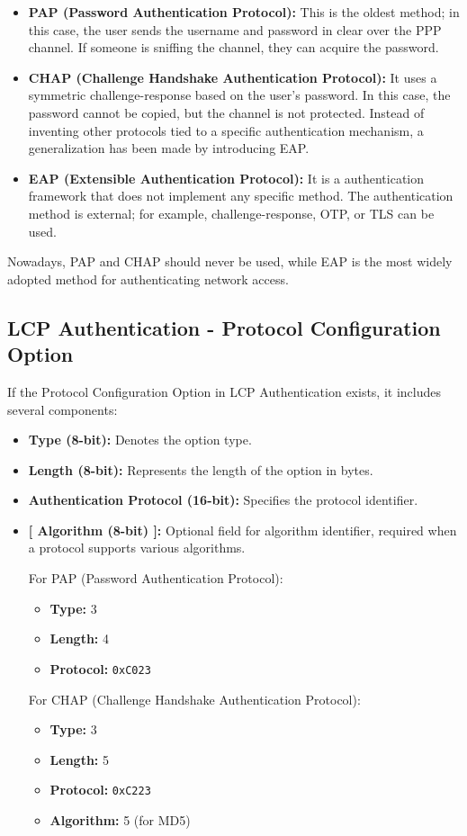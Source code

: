 \begin{itemize}
	\item \textbf{PAP (Password Authentication Protocol):} This is the oldest method; in this case, the user sends the username and password in clear over the PPP channel. If someone is sniffing the channel, they can acquire the password.

	\item \textbf{CHAP (Challenge Handshake Authentication Protocol):} It uses a symmetric challenge-response based on the user's password. In this case, the password cannot be copied, but the channel is not protected. Instead of inventing other protocols tied to a specific authentication mechanism, a generalization has been made by introducing EAP.

	\item \textbf{EAP (Extensible Authentication Protocol):} It is a authentication framework that does not implement any specific method. The authentication method is external; for example, challenge-response, OTP, or TLS can be used.
\end{itemize}

Nowadays, PAP and CHAP should never be used, while EAP is the most widely adopted method for authenticating network access.

\subsection{LCP Authentication - Protocol
	Configuration Option}
If the Protocol Configuration Option in LCP Authentication exists, it includes several components:

\begin{itemize}
	\item \textbf{Type (8-bit):} Denotes the option type.
	\item \textbf{Length (8-bit):} Represents the length of the option in bytes.
	\item \textbf{Authentication Protocol (16-bit):} Specifies the protocol identifier.
	\item \textbf{[ Algorithm (8-bit) ]:} Optional field for algorithm identifier, required when a protocol supports various algorithms.

	      For PAP (Password Authentication Protocol):
	      \begin{itemize}
		      \item \textbf{Type:} 3
		      \item \textbf{Length:} 4
		      \item \textbf{Protocol:} \texttt{0xC023}
	      \end{itemize}

	      For CHAP (Challenge Handshake Authentication Protocol):
	      \begin{itemize}
		      \item \textbf{Type:} 3
		      \item \textbf{Length:} 5
		      \item \textbf{Protocol:} \texttt{0xC223}
		      \item \textbf{Algorithm:} 5 (for MD5)
	      \end{itemize}
\end{itemize}


